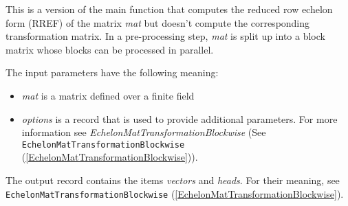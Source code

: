 \documentclass[a4paper,11pt]{report}
\begin{document}
{{{ This is a version of the main function that computes the reduced row echelon
form (RREF) of the matrix \emph{mat} but doesn't compute the corresponding transformation matrix. In a
pre-processing step, \emph{mat} is split up into a block matrix whose blocks can be processed in parallel. 

 The input parameters have the following meaning: 
\begin{itemize}
\item  \emph{mat} is a matrix defined over a finite field 
\item  \emph{options} is a record that is used to provide additional parameters. For more
information see \emph{EchelonMatTransformationBlockwise} (See \texttt{EchelonMatTransformationBlockwise} (\ref{EchelonMatTransformationBlockwise})). 
\end{itemize}
 

 The output record contains the items \emph{vectors} and \emph{heads}. For their meaning, see \texttt{EchelonMatTransformationBlockwise} (\ref{EchelonMatTransformationBlockwise}). }

 }

 }

   
\end{document}
